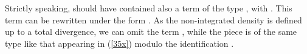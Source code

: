 \documentclass[a4paper,12pt]{article}
\begin{document}
Strictly speaking, \coordHE{} should have
contained also a term of the type \coordHE{}, with \coordHE{}. This
term can be rewritten under the form \coordHE{}. As the non-integrated density \coordHE{} is defined up to a total
divergence, we can omit the term \coordHE{}, while the piece \coordHE{} is of the same type like that
appearing in (\ref{35x}) modulo the identification \coordHE{}.
\end{document}

